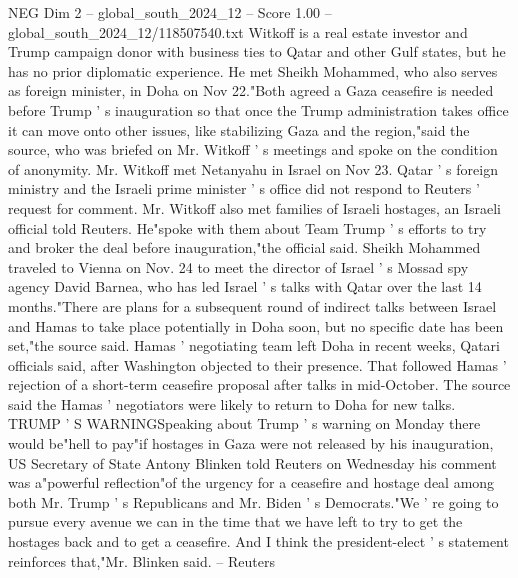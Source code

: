\begin{textsample}{NEG Dim 2 – global\_south\_2024\_12 – Score 1.00 – global\_south\_2024\_12/118507540.txt}
Witkoff is a real estate investor and Trump campaign donor with business ties to Qatar and other Gulf states, but he has no prior diplomatic experience.
He met Sheikh Mohammed, who also serves as foreign minister, in Doha on Nov 22."Both agreed a Gaza ceasefire is needed before Trump ' s inauguration so that once the Trump administration takes office it can move onto other issues, like stabilizing Gaza and the region,"said the source, who was briefed on Mr.
Witkoff ' s meetings and spoke on the condition of anonymity.
Mr.
Witkoff met Netanyahu in Israel on Nov 23.
Qatar ' s foreign ministry and the Israeli prime minister ' s office did not respond to Reuters ' request for comment.
Mr.
Witkoff also met families of Israeli hostages, an Israeli official told Reuters.
He"spoke with them about Team Trump ' s efforts to try and broker the deal before inauguration,"the official said.
Sheikh Mohammed traveled to Vienna on Nov. 24 to meet the director of Israel ' s Mossad spy agency David Barnea, who has led Israel ' s talks with Qatar over the last 14 months."There are plans for a subsequent round of indirect talks between Israel and Hamas to take place potentially in Doha soon, but no specific date has been set,"the source said.
Hamas ' negotiating team left Doha in recent weeks, Qatari officials said, after Washington objected to their presence.
That followed Hamas ' rejection of a short-term ceasefire proposal after talks in mid-October.
The source said the Hamas ' negotiators were likely to return to Doha for new talks.
TRUMP ' S WARNINGSpeaking about Trump ' s warning on Monday there would be"hell to pay"if hostages in Gaza were not released by his inauguration, US Secretary of State Antony Blinken told Reuters on Wednesday his comment was a"powerful reflection"of the urgency for a ceasefire and hostage deal among both Mr.
Trump ' s Republicans and Mr.
Biden ' s Democrats."We ' re going to pursue every avenue we can in the time that we have left to try to get the hostages back and to get a ceasefire.
And I think the president-elect ' s statement reinforces that,"Mr.
Blinken said. -- Reuters

\end{textsample}
